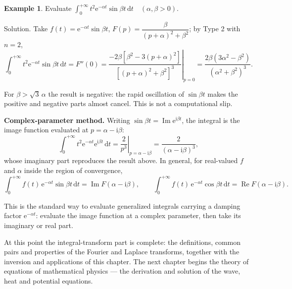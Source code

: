 \documentclass[11pt,a4paper]{article}
\theoremstyle{definition}
\newtheorem{example}{Example}[section]
\theoremstyle{plain}
\begin{document}
\begin{example}
Evaluate
$\displaystyle\int_{0}^{+\infty}t^{2}\mathrm{e}^{-\alpha t}\sin\beta t\,\mathrm{d}t
\quad(\alpha,\beta>0)$.
\end{example}

Solution. Take $f(t)=\mathrm{e}^{-\alpha t}\sin\beta t$,
$F(p)=\dfrac{\beta}{(p+\alpha)^2+\beta^2}$; by Type 2 with $n=2$,
\begin{equation*}
\int_{0}^{+\infty}t^{2}\mathrm{e}^{-\alpha t}\sin\beta t\,\mathrm{d}t=F''(0)
=\left.\frac{-2\beta\left[\beta^2-3(p+\alpha)^2\right]}
{\left[(p+\alpha)^2+\beta^2\right]^3}\right|_{p=0}
=\frac{2\beta\left(3\alpha^2-\beta^2\right)}{\left(\alpha^2+\beta^2\right)^3} .
\end{equation*}

For $\beta>\sqrt{3}\,\alpha$ the result is negative: the rapid oscillation of $\sin\beta t$ makes
the positive and negative parts almost cancel. This is not a computational slip.

\textbf{Complex-parameter method.} Writing $\sin\beta t=\operatorname{Im}\mathrm{e}^{\mathrm{i}\beta t}$,
the integral is the image function evaluated at $p=\alpha-\mathrm{i}\beta$:
\begin{equation*}
\int_{0}^{+\infty}t^{2}\mathrm{e}^{-\alpha t}\mathrm{e}^{\mathrm{i}\beta t}\,\mathrm{d}t
=\left.\frac{2}{p^{3}}\right|_{p=\alpha-\mathrm{i}\beta}
=\frac{2}{(\alpha-\mathrm{i}\beta)^{3}},
\end{equation*}
whose imaginary part reproduces the result above. In general, for real-valued $f$ and $\alpha$
inside the region of convergence,
\begin{equation*}
\int_{0}^{+\infty}f(t)\,\mathrm{e}^{-\alpha t}\sin\beta t\,\mathrm{d}t
=\operatorname{Im}F(\alpha-\mathrm{i}\beta),\qquad
\int_{0}^{+\infty}f(t)\,\mathrm{e}^{-\alpha t}\cos\beta t\,\mathrm{d}t
=\operatorname{Re}F(\alpha-\mathrm{i}\beta).
\end{equation*}

This is the standard way to evaluate generalized integrals carrying a damping factor
$\mathrm{e}^{-\alpha t}$: evaluate the image function at a complex parameter, then take its
imaginary or real part.

At this point the integral-transform part is complete: the definitions, common pairs and properties
of the Fourier and Laplace transforms, together with the inversion and applications of this chapter.
The next chapter begins the theory of equations of mathematical physics --- the derivation and
solution of the wave, heat and potential equations.
\end{document}
